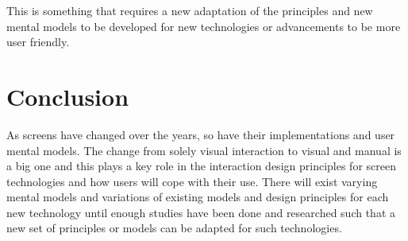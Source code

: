 \documentclass[12pt]{article}
\begin{document}
	This is something that requires a new adaptation of the principles and new mental models to be developed for new technologies or advancements to be more user friendly.

     
\section{Conclusion}

     As screens have changed over the years, so have their implementations and user mental models. The change from solely visual interaction to visual and manual is a big one and this plays a key role in the interaction design principles for screen technologies and how users will cope with their use. There will exist varying mental models and variations of existing models and design principles for each new technology until enough studies have been done and researched such that a new set of principles or models can be adapted for such technologies.



\end{document}

